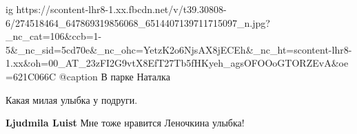  
 
 
 
 

\ifcmt
  ig https://scontent-lhr8-1.xx.fbcdn.net/v/t39.30808-6/274518464_647869319856068_6514407139711715097_n.jpg?_nc_cat=106&ccb=1-5&_nc_sid=5cd70e&_nc_ohc=YetzK2o6NjsAX8jECEh&_nc_ht=scontent-lhr8-1.xx&oh=00_AT_23zFI2G9vtX8EfT27Tb5fHKyeh_agsOFOOoGTORZEvA&oe=621C066C
	@caption В парке Наталка
\fi

Какая милая улыбка у подруги.

\textbf{Ljudmila Luist} Мне тоже нравится Леночкина улыбка!
